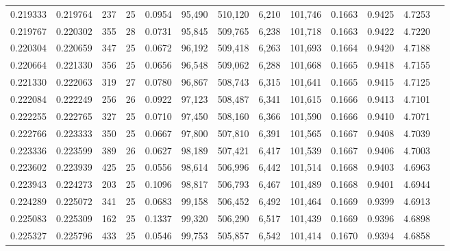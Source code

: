 \begin{tabular}{rrrrrrrrrrrrr}
0.219333 & 0.219764 &   237 &  25 &                                     0.0954 &  95,490 & 510,120 &   6,210 & 101,746 & 0.1663 & 0.9425 & 4.7253 \\
0.219767 & 0.220302 &   355 &  28 &                                     0.0731 &  95,845 & 509,765 &   6,238 & 101,718 & 0.1663 & 0.9422 & 4.7220 \\
0.220304 & 0.220659 &   347 &  25 &                                     0.0672 &  96,192 & 509,418 &   6,263 & 101,693 & 0.1664 & 0.9420 & 4.7188 \\
0.220664 & 0.221330 &   356 &  25 &                                     0.0656 &  96,548 & 509,062 &   6,288 & 101,668 & 0.1665 & 0.9418 & 4.7155 \\
0.221330 & 0.222063 &   319 &  27 &                                     0.0780 &  96,867 & 508,743 &   6,315 & 101,641 & 0.1665 & 0.9415 & 4.7125 \\
0.222084 & 0.222249 &   256 &  26 &                                     0.0922 &  97,123 & 508,487 &   6,341 & 101,615 & 0.1666 & 0.9413 & 4.7101 \\
0.222255 & 0.222765 &   327 &  25 &                                     0.0710 &  97,450 & 508,160 &   6,366 & 101,590 & 0.1666 & 0.9410 & 4.7071 \\
0.222766 & 0.223333 &   350 &  25 &                                     0.0667 &  97,800 & 507,810 &   6,391 & 101,565 & 0.1667 & 0.9408 & 4.7039 \\
0.223336 & 0.223599 &   389 &  26 &                                     0.0627 &  98,189 & 507,421 &   6,417 & 101,539 & 0.1667 & 0.9406 & 4.7003 \\
0.223602 & 0.223939 &   425 &  25 &                                     0.0556 &  98,614 & 506,996 &   6,442 & 101,514 & 0.1668 & 0.9403 & 4.6963 \\
0.223943 & 0.224273 &   203 &  25 &                                     0.1096 &  98,817 & 506,793 &   6,467 & 101,489 & 0.1668 & 0.9401 & 4.6944 \\
0.224289 & 0.225072 &   341 &  25 &                                     0.0683 &  99,158 & 506,452 &   6,492 & 101,464 & 0.1669 & 0.9399 & 4.6913 \\
0.225083 & 0.225309 &   162 &  25 &                                     0.1337 &  99,320 & 506,290 &   6,517 & 101,439 & 0.1669 & 0.9396 & 4.6898 \\
0.225327 & 0.225796 &   433 &  25 &                                     0.0546 &  99,753 & 505,857 &   6,542 & 101,414 & 0.1670 & 0.9394 & 4.6858 \\

\end{tabular}
